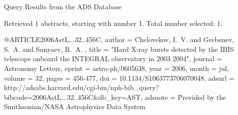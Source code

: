 Query Results from the ADS Database


Retrieved 1 abstracts, starting with number 1.  Total number selected: 1.

@ARTICLE{2006AstL...32..456C,
   author = {{Chelovekov}, I.~V. and {Grebenev}, S.~A. and {Sunyaev}, R.~A.
	},
    title = "{Hard X-ray bursts detected by the IBIS telescope onboard the INTEGRAL observatory in 2003 2004}",
  journal = {Astronomy Letters},
   eprint = {astro-ph/0605638},
     year = 2006,
    month = jul,
   volume = 32,
    pages = {456-477},
      doi = {10.1134/S1063773706070048},
   adsurl = {http://adsabs.harvard.edu/cgi-bin/nph-bib_query?bibcode=2006AstL...32..456C&db_key=AST},
  adsnote = {Provided by the Smithsonian/NASA Astrophysics Data System}
}


